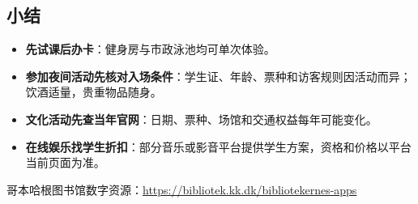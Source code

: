 \subsection{小结}

\begin{itemize}
  \item \textbf{先试课后办卡}：健身房与市政泳池均可单次体验。
  \item \textbf{参加夜间活动先核对入场条件}：学生证、年龄、票种和访客规则因活动而异；饮酒适量，贵重物品随身。
  \item \textbf{文化活动先查当年官网}：日期、票种、场馆和交通权益每年可能变化。
  \item \textbf{在线娱乐找学生折扣}：部分音乐或影音平台提供学生方案，资格和价格以平台当前页面为准。
\end{itemize}

哥本哈根图书馆数字资源：\url{https://bibliotek.kk.dk/bibliotekernes-apps}

